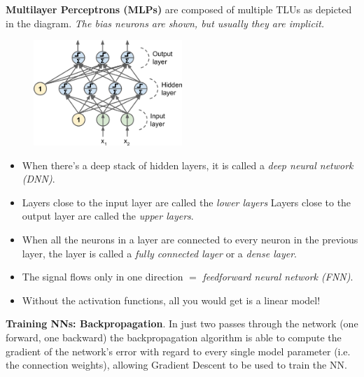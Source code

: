 \textbf{Multilayer Perceptrons (MLPs)} are composed of multiple TLUs as depicted in the diagram.\newline
\textit{The bias neurons are shown, but usually they are implicit.}
\begin{figure}[ht]
\centering
\includegraphics[width=0.50\textwidth]{./images/MLP.png}
\end{figure}

\vspace{-6.0mm}
\begin{itemize}
\item
When there's a deep stack of hidden layers, it is called a \textit{deep neural network (DNN)}.
\item
\vspace{-2.0mm}
Layers close to the input layer are called the \textit{lower layers}\newline
Layers close to the output layer are called the \textit{upper layers}.
\item
\vspace{-2.0mm}
When all the neurons in a layer are connected to every neuron in the previous layer,\newline
the layer is called a \textit{fully connected layer} or a \textit{dense layer}.
\item
\vspace{-2.0mm}
The signal flows only in one direction $=$ \textit{feedforward neural network (FNN)}.
\item
\vspace{-2.0mm}
Without the activation functions, all you would get is a linear model!
\end{itemize}

\newpage
\textbf{Training NNs: Backpropagation}.\newline
In just two passes through the network (one forward, one backward)
the backpropagation algorithm is able to compute the gradient of the network's error
with regard to every single model parameter (i.e. the connection weights),
allowing Gradient Descent to be used to train the NN.

